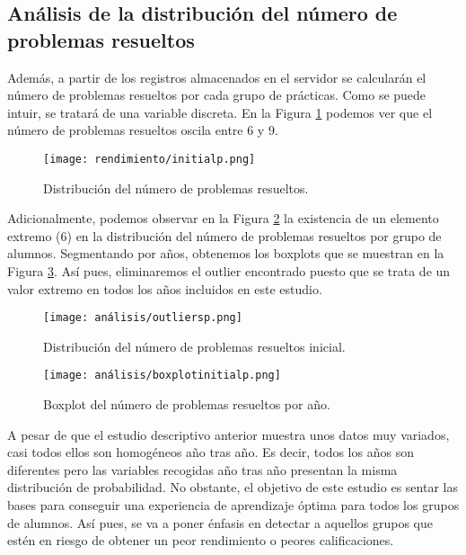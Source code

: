 \subsection{Análisis de la distribución del número de problemas resueltos}\label{sec:NumProblems}

Además, a partir de los registros almacenados en el servidor se calcularán el número de problemas resueltos por cada grupo de prácticas. Como se puede intuir, se tratará de una variable discreta. En la Figura \ref{fig:initialp} podemos ver que el número de problemas resueltos oscila entre $6$ y $9$.

\begin{figure}[H]
    \centering
    \texttt{[image: rendimiento/initialp.png]}
    \caption{Distribución del número de problemas resueltos.}
    \label{fig:initialp}
\end{figure}

Adicionalmente, podemos observar en la Figura \ref{fig:outliersp} la existencia de un elemento extremo ($6$) en la distribución del número de problemas resueltos por grupo de alumnos. Segmentando por años, obtenemos los boxplots que se muestran en la Figura \ref{fig:boxplotproblemsyear}. Así pues, eliminaremos el outlier encontrado puesto que se trata de un valor extremo en todos los años incluidos en este estudio.

\begin{figure}[H]
    \centering
    \texttt{[image: análisis/outliersp.png]}
    \caption{Distribución del número de problemas resueltos inicial.}
    \label{fig:outliersp}
\end{figure}

\begin{figure}[H]
    \centering
    \texttt{[image: análisis/boxplotinitialp.png]}
    \caption{Boxplot del número de problemas resueltos por año.}
    \label{fig:boxplotproblemsyear}
\end{figure}

A pesar de que el estudio descriptivo anterior muestra unos datos muy variados, casi todos ellos son homogéneos año tras año. Es decir, todos los años son diferentes pero las variables recogidas año tras año presentan la misma distribución de probabilidad. No obstante, el objetivo de este estudio es sentar las bases para conseguir una experiencia de aprendizaje óptima para todos los grupos de alumnos. Así pues, se va a poner énfasis en detectar a aquellos grupos que estén en riesgo de obtener un peor rendimiento o peores calificaciones.